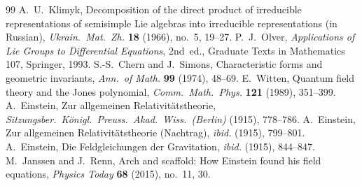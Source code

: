 \documentclass[11pt]{article}
\theoremstyle{remark}
\begin{document}
\begin{thebibliography}{99}
 A.~U.~Klimyk, Decomposition of the direct product of irreducible
representations of semisimple Lie algebras into irreducible representations (in Russian),
\emph{Ukrain.\ Mat.\ Zh.} \textbf{18} (1966), no.~5, 19--27.
 P.~J.~Olver, \emph{Applications of Lie Groups to Differential Equations},
2nd~ed., Graduate Texts in Mathematics 107, Springer, 1993.
 S.-S.~Chern and J.~Simons, Characteristic forms and geometric invariants,
\emph{Ann.\ of Math.} \textbf{99} (1974), 48--69.
 E.~Witten, Quantum field theory and the Jones polynomial, \emph{Comm.\ Math.\
Phys.} \textbf{121} (1989), 351--399.
 A.~Einstein, Zur allgemeinen Relativit\"atstheorie, \emph{Sitzungsber.\
K\"onigl.\ Preuss.\ Akad.\ Wiss.\ (Berlin)} (1915), 778--786.
\bibitem{Ein15b} A.~Einstein, Zur allgemeinen Relativit\"atstheorie (Nachtrag), \emph{ibid.}
(1915), 799--801.
\bibitem{Ein15c} A.~Einstein, Die Feldgleichungen der Gravitation, \emph{ibid.} (1915),
844--847.
\bibitem{JR} M.~Janssen and J.~Renn, Arch and scaffold: How Einstein found his field
equations, \emph{Physics Today} \textbf{68} (2015), no.~11, 30.
\end{thebibliography}
\end{document}
